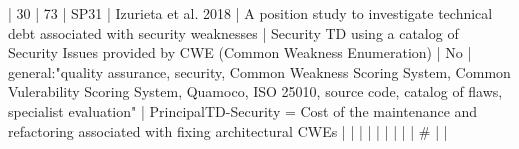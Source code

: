 | 30 |         73 | SP31 | Izurieta et al. 2018                                                 | A position study to investigate technical debt associated with security weaknesses                                                                                       | Security TD using a catalog of Security Issues provided by CWE (Common Weakness Enumeration)                                                                                                                                                             | No                                                                                                                                                                                                                                                                 | general:"quality assurance, security, Common Weakness Scoring System, Common Vulerability Scoring System, Quamoco, ISO 25010, source code, catalog of flaws, specialist evaluation"                                                                                                                      | PrincipalTD-Security = Cost of the maintenance and refactoring associated with fixing architectural CWEs                                                                                                                                                                                                                                                                                                                                                                                 |
|    |            |      |                                                                      |                                                                                                                                                                          |                                                                                                                                                                                                                                                            |                                                                                                                                                                                                                                                                      |  #                                                                                                                                                                                                                                                                                                       |                                                                                                                                                                                                                                                                                                                                                                                                                                                                                              |
